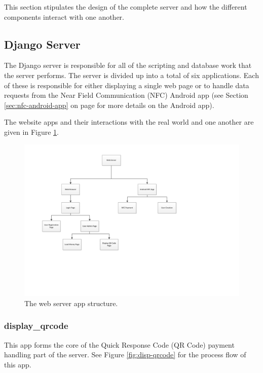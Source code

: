 This section stipulates the design of the complete server and how the different components
interact with one another. 

\subsection{Django Server}

The Django server is responsible for all of the scripting and database work that the server
performs. The server is divided up into a total of six applications. Each of these is
responsible for either displaying a single web page or to handle data requests from the
Near Field Communication (NFC) Android app (see Section \ref{sec:nfc-android-app} on
page \pageref{sec:nfc-android-app} for more details on the Android app).

The website apps and their interactions with the real world and one another
are given in Figure \ref{fig:website-apps}.

\begin{figure}
 \centering 
 \includegraphics[clip=true, trim = 0 130 130 30,
 scale=0.7]{website_structure}
 \caption{The web server app structure.}
 \label{fig:website-apps}
\end{figure}

\subsubsection{display\_qrcode}

This app forms the core of the Quick Response Code (QR Code) payment handling part of the
server. See Figure \ref{fig:disp-qrcode} for the process
flow of this app.

